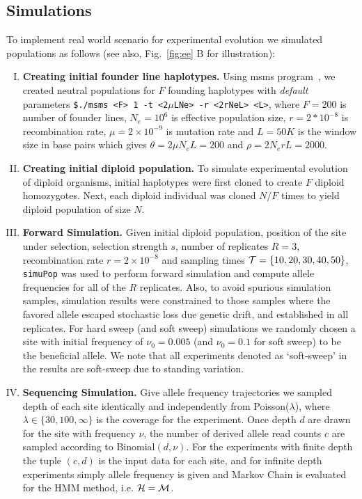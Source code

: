 \documentclass[11pt]{article}
\begin{document}
\subsection{Simulations}
To implement real world scenario for experimental evolution we
simulated populations as follows (see also, Fig.~\ref{fig:ee} B for
illustration):
\begin{enumerate}[I.]
\item {\bf Creating initial founder line haplotypes.} Using msms
  program~\cite{ewing2010msms}, we created neutral populations for $F$ founding
  haplotypes with \emph{default} parameters \texttt{\$./msms <F> 1 -t
    <2$\mu$LNe> -r <2rNeL> <L>}, where $F=200$ is number of founder
  lines, $N_e=10^6$ is effective population size, $r=2*10^{-8}$ is
  recombination rate, $\mu=2\times 10^{-9}$ is mutation rate and
  $L=50K$ is the window size in base pairs which gives $\theta=2\mu
  N_eL=200$ and $\rho=2N_erL=2000$. 
  
\item{\bf Creating initial diploid population.} To simulate
  experimental evolution of diploid organisms, initial haplotypes were
  first cloned to create $F$ diploid homozygotes. Next, each diploid
  individual was cloned $N/F$ times to yield diploid population of
  size $N$.

\item{\bf Forward Simulation.} Given initial diploid population,
  position of the site under selection, selection strength $s$, number
  of replicates $R=3$, recombination rate $r=2\times10^{-8}$ and
  sampling times ${\cal T}=\{10,20,30,40,50\}$, \texttt{simuPop} was used
  to perform forward simulation and compute allele frequencies for all
  of the $R$ replicates. Also, to avoid spurious simulation samples,
  simulation results were constrained to those samples where the
  favored allele escaped stochastic loss due genetic drift, and
  established in all replicates. For hard sweep (and soft sweep) simulations we 
  randomly chosen a site with initial frequency of $\nu_0=0.005$ (and 
  $\nu_0=0.1$ for soft sweep) to be the beneficial allele. We note that all 
  experiments
  denoted as `soft-sweep' in the results are soft-sweep due to
  standing variation.
  \item{\bf Sequencing Simulation.} Give allele frequency trajectories we 
  sampled depth of each site  identically and independently from 
  Poisson($\lambda$), where $\lambda \in \{30,100,\infty\}$ is the coverage for 
  the experiment. Once depth $d$ are drawn for the site with frequency $\nu$, 
  the number of derived allele read counts $c$ are sampled according to 
  Binomial$(d,\nu)$. For the experiments with finite depth the tuple $(c,d)$ is 
  the input data for each site, and for infinite depth experiments simply 
  allele frequency is given and Markov Chain is evaluated for the HMM method, 
  i.e. ${\cal H}={\cal M}$.
\end{enumerate}
\end{document}
